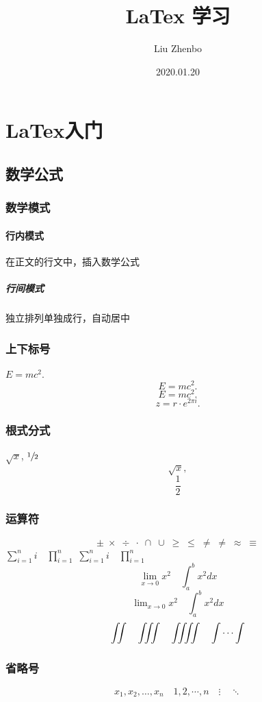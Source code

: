 \documentclass[UTF8]{ctexart}
\title{LaTex 学习}
\author{Liu Zhenbo}
\date{2020.01.20}
\begin{document}
\tableofcontents
\maketitle


\section{LaTex入门}

\subsection{数学公式}

\subsubsection{数学模式}
\paragraph{行内模式}
在正文的行文中，插入数学公式
\subparagraph{行间模式}
独立排列单独成行，自动居中

\subsubsection{上下标号}
$E=mc^2$.
\[E=mc^2.\]
\begin{equation}
    E=mc^2.
\end{equation}
\[z = r\cdot e^{2\pi i}. \]

\subsubsection{根式分式}
$\sqrt{x}$, $\sfrac{1}{2}$
\[ \sqrt{x},  \]
\[\frac{1}{2}\]

\subsubsection{运算符}
\[ \pm\; \times\;  \div\; \cdot\; \cap\; \cup\;\geq\;\leq\;\neq\;\neq\;\approx\;\equiv\]
$ \sum_{i=1}^n i\quad \prod_{i=1}^n $
$ \sum\limits_{i=1}^n i\quad \prod\limits_{i=1}^n $
\[\lim_{x\to0}x^2 \quad \int_a^b x^2 dx \]
\[\lim \nolimits _{x\to0}x^2 \quad \int \nolimits_a^b x^2 dx \]
\[ \iint\quad \iiint\quad \iiiint\quad \idotsint\]

\subsubsection{省略号}
\[x_1, x_2, \dots, x_n\quad 1,2, \cdots, n\quad \vdots\quad \ddots\]
\end{document}
